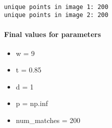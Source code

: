 \documentclass[11pt]{article}
\providecommand{\tightlist}{%
      \setlength{\itemsep}{0pt}\setlength{\parskip}{0pt}}
\begin{document}
    \begin{center}
    \end{center}
    { \hspace*{\fill} \\}
    
    \begin{Verbatim}[commandchars=\\\{\}]
unique points in image 1: 200
unique points in image 2: 200

    \end{Verbatim}

    \paragraph{Final values for
parameters}\label{final-values-for-parameters}

\begin{itemize}
\tightlist
\item
  w = 9
\item
  t = 0.85
\item
  d = 1
\item
  p = np.inf
\item
  num\_matches = 200
\end{itemize}


    
    
    
    
\end{document}
